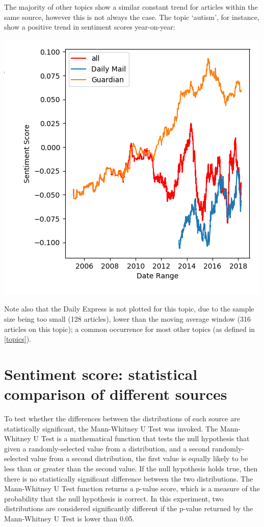 \documentclass{report}
\begin{document}
The majority of other topics show a similar constant trend for articles within the same source, however this is not always the case. The topic `autism', for instance, show a positive trend in sentiment scores year-on-year:

\begin{center}
	\includegraphics[width=0.5\linewidth]{autism.png}
\end{center}

Note also that the Daily Express is not plotted for this topic, due to the sample size being too small (128 articles), lower than the moving average window (316 articles on this topic); a common occurrence for most other topics (as defined in \ref{topics}).

\section{Sentiment score: statistical comparison of different sources} \label{Sentiment score: statistical comparison of different sources}

To test whether the differences between the distributions of each source are statistically significant, the Mann-Whitney U Test \cite{mann1947test} was invoked.
The Mann-Whitney U Test is a mathematical function that tests the null hypothesis that given a randomly-selected value from a distribution, and a second randomly-selected value from a second distribution, the first value is equally likely to be less than or greater than the second value.
If the null hypothesis holds true, then there is no statistically significant difference between the two distributions.
The Mann-Whitney U Test function returns a p-value score, which is a measure of the probability that the null hypothesis is correct.
In this experiment, two distributions are considered significantly different if the p-value returned by the Mann-Whitney U Test is lower than 0.05.
\end{document}
